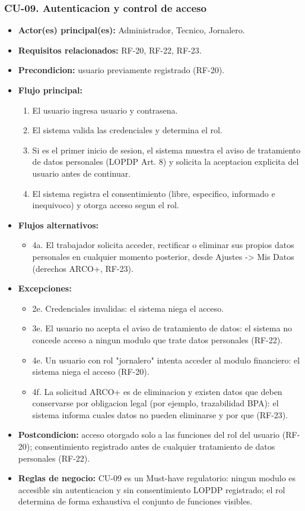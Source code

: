 \documentclass[11pt,a4paper]{article}
\begin{document}
\subsubsection{CU-09. Autenticacion y control de acceso}
\begin{itemize}
\item \textbf{Actor(es) principal(es):} Administrador, Tecnico, Jornalero.
\item \textbf{Requisitos relacionados:} RF-20, RF-22, RF-23.
\item \textbf{Precondicion:} usuario previamente registrado (RF-20).
\item \textbf{Flujo principal:}
  \begin{enumerate}
  \item El usuario ingresa usuario y contrasena.
  \item El sistema valida las credenciales y determina el rol.
  \item Si es el primer inicio de sesion, el sistema muestra el aviso de tratamiento de datos personales (LOPDP Art. 8) y solicita la aceptacion explicita del usuario antes de continuar.
  \item El sistema registra el consentimiento (libre, especifico, informado e inequivoco) y otorga acceso segun el rol.
  \end{enumerate}
\item \textbf{Flujos alternativos:}
  \begin{itemize}
  \item 4a. El trabajador solicita acceder, rectificar o eliminar sus propios datos personales en cualquier momento posterior, desde Ajustes -> Mis Datos (derechos ARCO+, RF-23).
  \end{itemize}
\item \textbf{Excepciones:}
  \begin{itemize}
  \item 2e. Credenciales invalidas: el sistema niega el acceso.
  \item 3e. El usuario no acepta el aviso de tratamiento de datos: el sistema no concede acceso a ningun modulo que trate datos personales (RF-22).
  \item 4e. Un usuario con rol "jornalero" intenta acceder al modulo financiero: el sistema niega el acceso (RF-20).
  \item 4f. La solicitud ARCO+ es de eliminacion y existen datos que deben conservarse por obligacion legal (por ejemplo, trazabilidad BPA): el sistema informa cuales datos no pueden eliminarse y por que (RF-23).
  \end{itemize}
\item \textbf{Postcondicion:} acceso otorgado solo a las funciones del rol del usuario (RF-20); consentimiento registrado antes de cualquier tratamiento de datos personales (RF-22).
\item \textbf{Reglas de negocio:} CU-09 es un Must-have regulatorio: ningun modulo es accesible sin autenticacion y sin consentimiento LOPDP registrado; el rol determina de forma exhaustiva el conjunto de funciones visibles.
\end{itemize}
\end{document}
